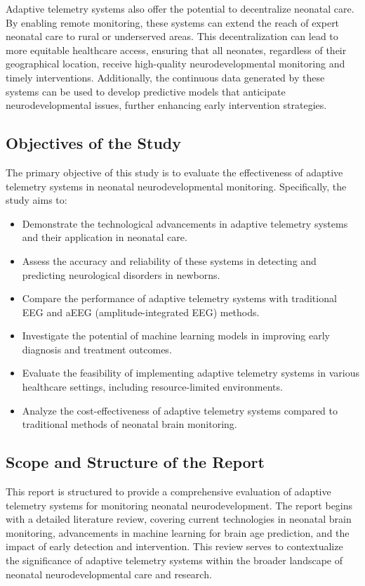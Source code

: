 \documentclass[12pt,journal,compsoc]{IEEEtran}
\begin{document}
Adaptive telemetry systems also offer the potential to decentralize neonatal care. By enabling remote monitoring, these systems can extend the reach of expert neonatal care to rural or underserved areas. This decentralization can lead to more equitable healthcare access, ensuring that all neonates, regardless of their geographical location, receive high-quality neurodevelopmental monitoring and timely interventions. Additionally, the continuous data generated by these systems can be used to develop predictive models that anticipate neurodevelopmental issues, further enhancing early intervention strategies.

\subsection{Objectives of the Study}
The primary objective of this study is to evaluate the effectiveness of adaptive telemetry systems in neonatal neurodevelopmental monitoring. Specifically, the study aims to:
\begin{itemize}
    \item Demonstrate the technological advancements in adaptive telemetry systems and their application in neonatal care.
    \item Assess the accuracy and reliability of these systems in detecting and predicting neurological disorders in newborns.
    \item Compare the performance of adaptive telemetry systems with traditional EEG and aEEG (amplitude-integrated EEG) methods.
    \item Investigate the potential of machine learning models in improving early diagnosis and treatment outcomes.
    \item Evaluate the feasibility of implementing adaptive telemetry systems in various healthcare settings, including resource-limited environments.
    \item Analyze the cost-effectiveness of adaptive telemetry systems compared to traditional methods of neonatal brain monitoring.
\end{itemize}

\subsection{Scope and Structure of the Report}
This report is structured to provide a comprehensive evaluation of adaptive telemetry systems for monitoring neonatal neurodevelopment. The report begins with a detailed literature review, covering current technologies in neonatal brain monitoring, advancements in machine learning for brain age prediction, and the impact of early detection and intervention. This review serves to contextualize the significance of adaptive telemetry systems within the broader landscape of neonatal neurodevelopmental care and research.
\end{document}
